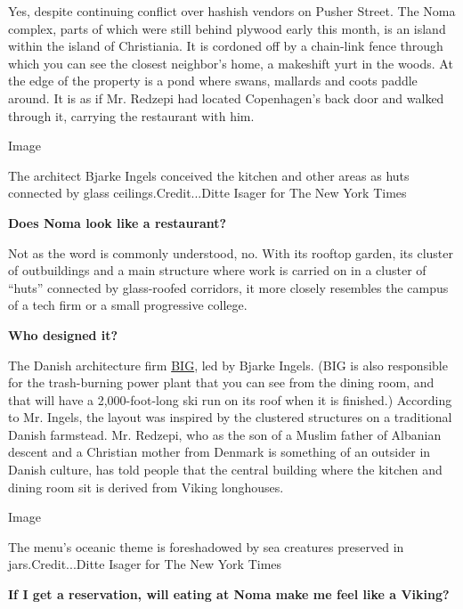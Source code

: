 Yes, despite continuing conflict over hashish vendors on Pusher Street.
The Noma complex, parts of which were still behind plywood early this
month, is an island within the island of Christiania. It is cordoned off
by a chain-link fence through which you can see the closest neighbor's
home, a makeshift yurt in the woods. At the edge of the property is a
pond where swans, mallards and coots paddle around. It is as if Mr.
Redzepi had located Copenhagen's back door and walked through it,
carrying the restaurant with him.

Image

The architect Bjarke Ingels conceived the kitchen and other areas as
huts connected by glass ceilings.Credit...Ditte Isager for The New York
Times

\textbf{Does Noma look like a restaurant?}

Not as the word is commonly understood, no. With its rooftop garden, its
cluster of outbuildings and a main structure where work is carried on in
a cluster of ``huts'' connected by glass-roofed corridors, it more
closely resembles the campus of a tech firm or a small progressive
college.

\textbf{Who designed it?}

The Danish architecture firm \href{http://www.big.dk/}{BIG}, led by
Bjarke Ingels. (BIG is also responsible for the trash-burning power
plant that you can see from the dining room, and that will have a
2,000-foot-long ski run on its roof when it is finished.) According to
Mr. Ingels, the layout was inspired by the clustered structures on a
traditional Danish farmstead. Mr. Redzepi, who as the son of a Muslim
father of Albanian descent and a Christian mother from Denmark is
something of an outsider in Danish culture, has told people that the
central building where the kitchen and dining room sit is derived from
Viking longhouses.

Image

The menu's oceanic theme is foreshadowed by sea creatures preserved in
jars.Credit...Ditte Isager for The New York Times

\textbf{If I get a reservation, will eating at Noma make me feel like a
Viking?}

